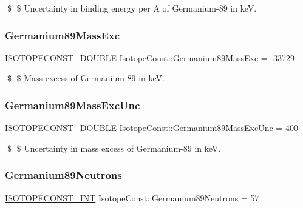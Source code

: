 \$ \$ Uncertainty in binding energy per A of Germanium-\/89 in keV. \mbox{\label{group___isotope_const-_germanium-_ge89_ga939aa94143fea5beb65e49d3961ebfc9}} 
\subsubsection{\texorpdfstring{Germanium89\+Mass\+Exc}{Germanium89MassExc}}
{\footnotesize\ttfamily \mbox{\hyperlink{group___isotope_const-_macros_ga8f45a7272ce02c0b4c65c44636ed719a}{I\+S\+O\+T\+O\+P\+E\+C\+O\+N\+S\+T\+\_\+\+D\+O\+U\+B\+LE}} Isotope\+Const\+::\+Germanium89\+Mass\+Exc = -\/33729}

\$ \$ Mass excess of Germanium-\/89 in keV. \mbox{\label{group___isotope_const-_germanium-_ge89_ga47031ee8f95a2059ab97bf9b662bd58e}} 
\subsubsection{\texorpdfstring{Germanium89\+Mass\+Exc\+Unc}{Germanium89MassExcUnc}}
{\footnotesize\ttfamily \mbox{\hyperlink{group___isotope_const-_macros_ga8f45a7272ce02c0b4c65c44636ed719a}{I\+S\+O\+T\+O\+P\+E\+C\+O\+N\+S\+T\+\_\+\+D\+O\+U\+B\+LE}} Isotope\+Const\+::\+Germanium89\+Mass\+Exc\+Unc = 400}

\$ \$ Uncertainty in mass excess of Germanium-\/89 in keV. \mbox{\label{group___isotope_const-_germanium-_ge89_ga6ba2b734b7b7485fa6df3a0e257d796f}} 
\subsubsection{\texorpdfstring{Germanium89\+Neutrons}{Germanium89Neutrons}}
{\footnotesize\ttfamily \mbox{\hyperlink{group___isotope_const-_macros_ga5f18360b3e99483a35c32d789e62621c}{I\+S\+O\+T\+O\+P\+E\+C\+O\+N\+S\+T\+\_\+\+I\+NT}} Isotope\+Const\+::\+Germanium89\+Neutrons = 57}

